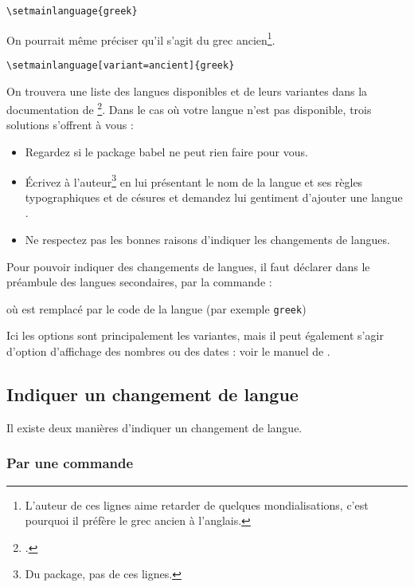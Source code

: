 \begin{verbatim}
\setmainlanguage{greek}
\end{verbatim}

On pourrait même préciser qu'il s'agit du grec ancien\footnote{L'auteur de ces lignes aime retarder de quelques mondialisations, c'est pourquoi il préfère le grec ancien à l'anglais.}.

\begin{verbatim}
\setmainlanguage[variant=ancient]{greek}
\end{verbatim}


On trouvera une liste des langues disponibles et de leurs variantes dans la documentation de \footcite{polyglossia}. Dans le cas où votre langue n'est pas disponible, trois solutions s'offrent à vous :
\begin{itemize}
\item Regardez si le package babel ne peut rien faire pour vous. 
\item Écrivez à l'auteur\footnote{Du package, pas de ces lignes.} en lui présentant le nom de la langue et ses règles typographiques et de césures et demandez lui gentiment d'ajouter une langue .
\item Ne respectez pas les bonnes raisons d'indiquer les changements de langues.
\end{itemize}

Pour pouvoir indiquer des changements de langues, il faut déclarer dans le préambule des langues secondaires, par la commande : 


où  est remplacé par le code de la langue (par exemple \verb|greek|)

Ici les options sont principalement les variantes, mais il peut également s'agir d'option d'affichage des nombres ou des dates : voir le manuel de .

\subsection{Indiquer un changement de langue}

Il existe deux manières d'indiquer un changement de langue.

\subsubsection{Par une commande}


